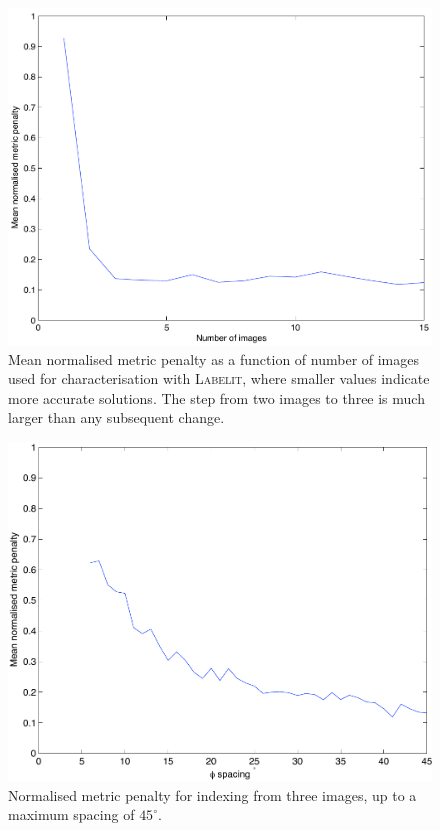 \documentclass[a4paper, 11pt]{article}
\begin{document}
\begin{figure}
\caption{Mean normalised metric penalty as a function of number of
  images used for characterisation with \textsc{Labelit}, where smaller values
  indicate more accurate solutions. The step from two images to three
  is much larger than any subsequent change.
\label{figure:no_images}}
\centering
\includegraphics[scale=0.5]{figures/no_images.pdf}
\end{figure}

\begin{figure}
\caption{Normalised metric penalty for indexing from three images, up
  to a maximum spacing of $45^{\circ}$.
\label{figure:phi_spacing_45a}}
\centering
\includegraphics[scale=0.5]{figures/phi_spacing_45a.pdf}
\end{figure}
\end{document}
